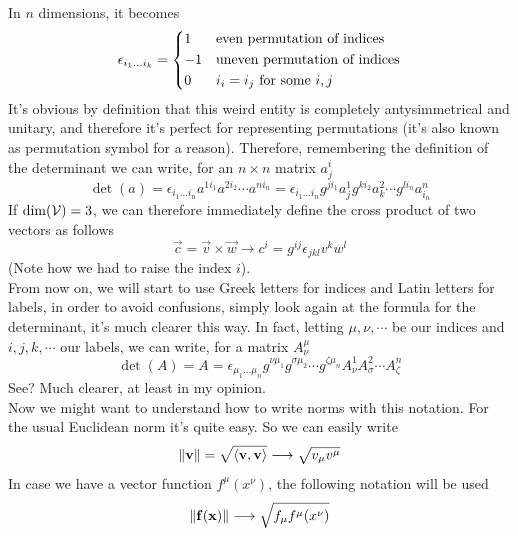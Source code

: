 \documentclass[../complete.tex]{subfiles}
\begin{document}
In $n$ dimensions, it becomes
\begin{equation}
	\epsilon_{i_1\ldots i_k}=\begin{dcases}1&\text{even permutation of indices}\\-1&\text{uneven permutation of indices}\\0&i_i=i_j\text{ for some }i,j\end{dcases}
	\label{eq:ndlc}
\end{equation}
It's obvious by definition that this weird entity is completely antysimmetrical and unitary, and therefore it's perfect for representing permutations (it's also known as permutation symbol for a reason). Therefore, remembering the definition of the determinant we can write, for an $n\times n$ matrix $a^i_j$
\begin{equation}
	\det(a)=\epsilon_{i_1\ldots i_n}a^{1i_1}a^{2i_2}\cdots a^{ni_n}=\epsilon_{i_1\ldots i_n}g^{ji_1}a^1_{j}g^{ki_2}a^2_{k}\cdots g^{li_n}a^n_{i_n}
	\label{eq:determinanteinnot}
\end{equation}
If $\dim(\mathcal{V})=3$, we can therefore immediately define the cross product of two vectors as follows
\begin{equation}
	\vec{c}=\vec{v}\times\vec{w}\longrightarrow c^i=g^{ij}\epsilon_{jkl}v^kw^l
	\label{eq:crossproducteinst}
\end{equation}
(Note how we had to raise the index $i$).\\
From now on, we will start to use Greek letters for indices and Latin letters for labels, in order to avoid confusions, simply look again at the formula for the determinant, it's much clearer this way. In fact, letting $\mu,\nu,\cdots$ be our indices and $i,j,k,\cdots$ our labels, we can write, for a matrix $A^\mu_\nu$
\begin{equation}
	\det(A)=A=\epsilon_{\mu_1\ldots \mu_n}g^{\nu\mu_1}g^{\sigma\mu_2}\cdots g^{\zeta\mu_{n}}A^1_{\nu}A^2_\sigma\cdots A^n_\zeta
	\label{eq:greekdeterminant}
\end{equation}
See? Much clearer, at least in my opinion.\\
Now we might want to understand how to write norms with this notation. For the usual Euclidean norm it's quite easy. So we can easily write
\begin{equation}
	\norm{\mathbf{v}}=\sqrt{\langle \mathbf{v}, \mathbf{v} \rangle}\overset{}{\longrightarrow}\sqrt{v_\mu v^\mu}
	\label{eq:2normein}
\end{equation}
In case we have a vector function $f^\mu(x^\nu)$, the following notation will be used
\begin{equation}
	\norm{\mathbf{f}(\mathbf{x})}\overset{}{\longrightarrow} \sqrt{f_\mu f^\mu(x^\nu)}
	\label{eq:fnormein}
\end{equation}
\end{document}
